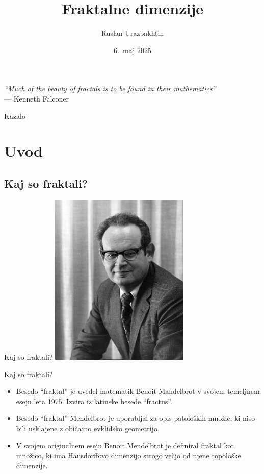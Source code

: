 \documentclass[10pt]{beamer}
\title[Fraktalne dimenzije]{Fraktalne dimenzije}
\author{Ruslan Urazbakhtin}
\institute{Fakulteta za matematiko in fiziko, Univerza v Ljubljani}
\date{6.\ maj 2025}
\begin{document}
\begin{frame}
  \titlepage

  \vfill %

  \begin{flushright}
    \small
    \textit{"`Much of the beauty of fractals is to be found in their mathematics"'} \\
    \hspace{1em} --- Kenneth Falconer
  \end{flushright}
\end{frame}

\begin{frame}{Kazalo}
  \tableofcontents
\end{frame}

\section{Uvod}
\subsection{Kaj so fraktali?}

\begin{frame}{Kaj so fraktali?}
    \centering
    \includegraphics[width=0.5\textwidth]{img/mandelbrot.jpg} 
\end{frame}

\begin{frame}{Kaj so fraktali?}
    \begin{itemize}
        \item Besedo "`fraktal"' je uvedel matematik Benoit Mandelbrot v svojem temeljnem eseju leta 1975. Izvira iz latinske besede "`fractus"'. 
        \item Besedo "`fraktal"' Mendelbrot je uporabljal za opis patoloških množic, ki niso bili usklajene z običajno evklidsko geometrijo.
        \item V svojem originalnem eseju Benoit Mendelbrot je definiral fraktal kot množico, ki ima Hausdorffovo dimenzijo strogo večjo od njene topološke dimenzije. 
    \end{itemize}    
\end{frame}
\end{document}
